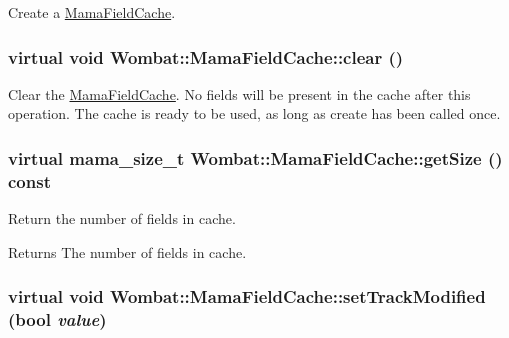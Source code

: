 Create a \hyperlink{classWombat_1_1MamaFieldCache}{MamaFieldCache}. \hypertarget{classWombat_1_1MamaFieldCache_a8c4771143c10b12495095ae3ec6321c3}{
\subsubsection[{clear}]{\setlength{\rightskip}{0pt plus 5cm}virtual void Wombat::MamaFieldCache::clear ()}}
\label{classWombat_1_1MamaFieldCache_a8c4771143c10b12495095ae3ec6321c3}


Clear the {\ttfamily \hyperlink{classWombat_1_1MamaFieldCache}{MamaFieldCache}}. No fields will be present in the cache after this operation. The cache is ready to be used, as long as create has been called once. \hypertarget{classWombat_1_1MamaFieldCache_a292e92e9f81abe5a09faffe0ea9a0c4b}{
\subsubsection[{getSize}]{\setlength{\rightskip}{0pt plus 5cm}virtual {\bf mama\_\-size\_\-t} Wombat::MamaFieldCache::getSize () const}}
\label{classWombat_1_1MamaFieldCache_a292e92e9f81abe5a09faffe0ea9a0c4b}


Return the number of fields in cache. \begin{DoxyReturn}{Returns}
The number of fields in cache. 
\end{DoxyReturn}
\hypertarget{classWombat_1_1MamaFieldCache_aca21dc3b1435ede84dabad0cfca4aee3}{
\subsubsection[{setTrackModified}]{\setlength{\rightskip}{0pt plus 5cm}virtual void Wombat::MamaFieldCache::setTrackModified (bool {\em value})}}
\label{classWombat_1_1MamaFieldCache_aca21dc3b1435ede84dabad0cfca4aee3}


